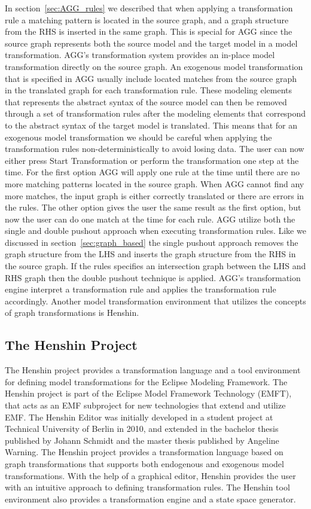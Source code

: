 In section~\ref{sec:AGG_rules} we described that when applying a transformation
rule a matching pattern is located in the source graph, and a graph structure
from the RHS is inserted in the same graph. This is special for AGG since
the source graph represents both the source model and the target model in a
model transformation. AGG's transformation system provides an in-place model
transformation directly on the source graph. An exogenous model transformation
that is specified in AGG usually include located matches from the source graph
in the translated graph for each transformation rule. These modeling elements that
represents the abstract syntax of the source model can then be removed through
a set of transformation rules after the modeling elements that correspond to
the abstract syntax of the target model is translated. This means that for an
exogenous model transformation we should be careful when applying the
transformation rules non-deterministically to avoid losing data. The user can
now either press Start Transformation or perform the transformation one step at
the time. For the first option AGG will apply one rule at the time until there are no more matching
patterns located in the source graph. When AGG cannot find any more matches,
the input graph is either correctly translated or there are errors in the rules.
The other option gives the user the same result as the first option, but now the
user can do one match at the time for each rule. AGG utilize both the single
and double pushout approach when executing transformation
rules\cite{Taentzer2004}. Like we discussed in section~\ref{sec:graph_based} the
single pushout approach removes the graph structure from the LHS and inserts
the graph structure from the RHS in the source graph. If the rules specifies an
intersection graph between the LHS and RHS graph then the double pushout
technique is applied. AGG's transformation engine interpret a transformation
rule and applies the transformation rule accordingly. Another model
transformation environment that utilizes the concepts of graph transformations
is Henshin.

\subsection{The Henshin Project}

The Henshin project\cite{Henshin} provides a transformation
language and a tool environment for defining model transformations for the
Eclipse Modeling Framework. The Henshin project is part of the Eclipse Model
Framework Technology (EMFT), that acts as an EMF subproject for new
technologies that extend and utilize EMF. The Henshin Editor was initially
developed in a student project at Technical University of Berlin in 2010, and
extended in the bachelor thesis \cite{JohannSchmidt} published by Johann Schmidt
and the master thesis \cite{AngelineWarning} published by Angeline Warning.
The Henshin project provides a transformation language based on graph
transformations that supports both endogenous and exogenous model
transformations. With the help of a graphical editor, Henshin provides the user
with an intuitive approach to defining transformation rules. The Henshin tool
environment also provides a transformation engine and a state space generator.

